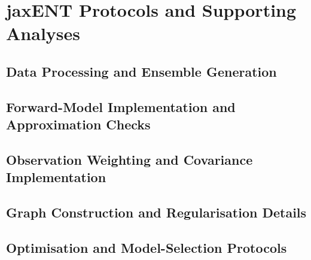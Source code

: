 \chapter{jaxENT Protocols and Supporting Analyses}
\label{app:jaxent-protocols}

\section{Data Processing and Ensemble Generation}
\label{app:jaxent-inputs}

\section{Forward-Model Implementation and Approximation Checks}
\label{app:jaxent-forward}

\section{Observation Weighting and Covariance Implementation}
\label{app:jaxent-weighting}

\section{Graph Construction and Regularisation Details}
\label{app:jaxent-regularisation}

\section{Optimisation and Model-Selection Protocols}
\label{app:jaxent-optimisation}

